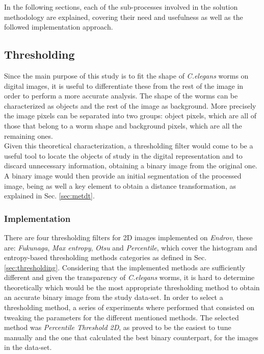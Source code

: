 In the following sections, each of the sub-processes involved in the solution
methodology are explained, covering their need and usefulness as
well as the followed implementation approach.

  

\subsection{Thresholding}
\label{sec:metthres}

Since the main purpose of this study is to fit the shape of \emph{C.elegans} worms on digital
images, it is useful to differentiate these from the rest of the image in order to perform a more 
accurate analysis. The shape of the worms
can be characterized as objects and the rest of the image as background. More precisely
the image pixels can be separated into two groups: object pixels, which are all of those
that belong to a worm shape and background pixels, which are all the remaining ones.\\

Given this theoretical characterization, a thresholding filter would come to be a useful tool 
to locate the objects of study in the digital representation and to discard unnecessary 
information, obtaining a binary image from the original one. A binary image would then provide
an initial segmentation of the processed image, being as well a key element to obtain
a distance transformation, as explained in Sec. \ref{sec:metdt}.

\subsubsection{Implementation}
\label{sec:thresimp}
There are four thresholding filters for 2D images implemented on \emph{Endrov}, these are: 
\emph{Fukunaga}, \emph{Max entropy}, \emph{Otsu} and \emph{Percentile}, which cover the 
histogram and entropy-based thresholding methods categories as defined in Sec.\ref{sec:thresholding}.
Considering that the implemented methods are sufficiently different and given the transparency
of \emph{C.elegans} worms, it is hard to determine theoretically which would be the most appropriate 
thresholding method to obtain an accurate binary image from the study data-set. In order 
to select a thresholding method, a series of experiments where performed that consisted on 
tweaking the parameters for the different mentioned methods. 
The selected method was \emph{Percentile Threshold 2D}, as proved to be the easiest to tune manually and the 
one that calculated the best binary counterpart, for the images in the data-set.

